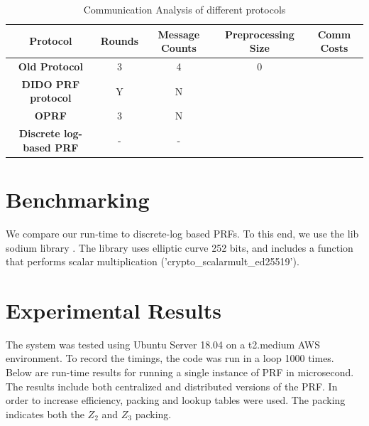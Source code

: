\begin{table}[htbp]
	\label{CommunicationCosts}
	\begin{center}
		\begin{tabular}{|c|c|c|c|c|}
			\hline
			\textbf{Protocol} & \textbf{Rounds}  & \textbf{Message Counts} &  \textbf{Preprocessing Size} & \textbf{Comm Costs}  \\
			\hline
			\hline
			\textbf{Old Protocol}  & 3  & 4 &  0 &	 \\
			\hline
			\textbf{DIDO PRF protocol} & Y	& N & &  	\\
			\hline
			\textbf{OPRF} & 3 & N & &  	\\
			\hline
			\textbf{Discrete log-based PRF} &  - & - &  & \\
			\hline
			
		\end{tabular}
		
		\vspace{-1mm}
		\caption{Communication Analysis of different protocols}
		\label{CommunicationCosts}
	\end{center}
	\vspace{-5mm}
\end{table}


\section{Benchmarking}

We compare our run-time to discrete-log based PRFs. To this end, we use the lib sodium library \cite{LibSodium}. The library uses elliptic curve 252 bits, and includes a function that performs scalar multiplication ('crypto\_scalarmult\_ed25519').


\section{Experimental Results}

The system was tested using Ubuntu Server 18.04 on a t2.medium AWS environment. To record the timings, the code was run in a loop 1000 times. Below are run-time results for running a single instance of PRF in microsecond. The results include both centralized and distributed versions of the PRF. In order to increase efficiency, packing and lookup tables were used. The packing indicates both the $Z_2$ and $Z_3$ packing.

